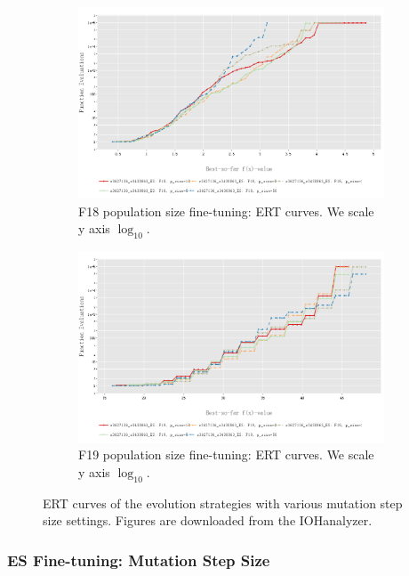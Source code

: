 \documentclass{article}
\begin{document}
\begin{figure}[!ht]
    \begin{subfigure}[h]{0.95\linewidth}
        \includegraphics[width=\linewidth]{es/f18/ERT18ps.png}
        \caption{F18 population size fine-tuning: ERT curves. We scale y axis $\log_{10}$.}
    \end{subfigure}
    \hfill
    \begin{subfigure}[h]{0.95\linewidth}
        \includegraphics[width=\linewidth]{es/f19/ERT19ps.png}
        \caption{F19 population size fine-tuning: ERT curves. We scale y axis $\log_{10}$.}
    \end{subfigure}
    \caption{ERT curves of the evolution strategies with various mutation step size settings. Figures are downloaded from the IOHanalyzer.}
    \label{fig:experi-es-psize-ert}
\end{figure}

\subsubsection{ES Fine-tuning: Mutation Step Size}
\end{document}
